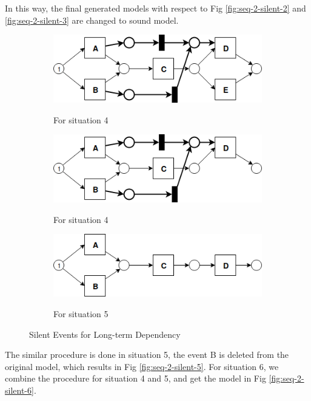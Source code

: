 \documentclass[]{article}
\begin{document}
\iffalse
In this way, the final generated models with respect to Fig \ref{fig:seq-2-silent-2} and \ref{fig:seq-2-silent-3} are changed to sound model. 
\begin{figure}[!h]
	\centering
	\begin{subfigure}[b]{\textwidth}
		\centering
		\includegraphics[width=\linewidth]{images/LT_Seq_01_Silent_03.png}
		\label{fig:seq-2-silent-2-original}
		\caption{For situation 4}
	\end{subfigure}
	\hfill
	\begin{subfigure}[b]{\textwidth}
		\centering
		\includegraphics[width=\linewidth]{images/LT_Seq_01_Silent_03_AfterDeletion.png}
		\label{fig:seq-2-silent-afterdeletion}
		\caption{For situation 4}
	\end{subfigure}
	\hfill
	\begin{subfigure}[c]{\textwidth}
		\centering
		\includegraphics[width=\linewidth]{images/LT_Seq_01_Silent_03_AfterDeletion_02.png}
		\label{fig:seq-2-silent-afterdeletion-2}
		\caption{For situation 5}
	\end{subfigure}
	\label{fig:seq-2-silent-changes}
	\caption{Silent Events for Long-term Dependency}
\end{figure}
The similar procedure is done in situation 5, the event B is deleted from the original model, which results in Fig \ref{fig:seq-2-silent-5}.  For situation 6, we combine the procedure for situation 4 and 5, and get the model in Fig \ref{fig:seq-2-silent-6}.
\end{document}
